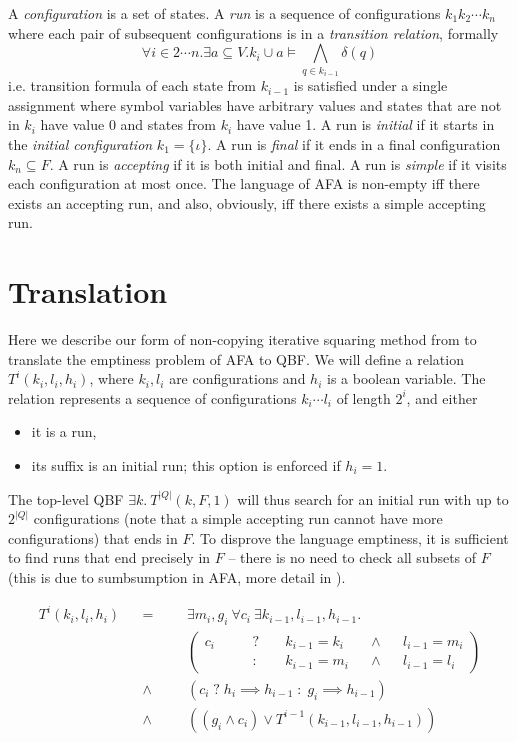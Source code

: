 \documentclass{article}
\begin{document}
A \emph{configuration} is a set of states.
%
A \emph{run} is a sequence of configurations $k_1 k_2 \cdots k_n$ where each pair of subsequent configurations is in a \emph{transition relation}, formally
\[\forall i \in {2 \cdots n}. \exists a \subseteq V. k_i \cup a \models \bigwedge_{q \in k_{i-1}} \delta(q)\]
i.e. transition formula of each state from $k_{i-1}$ is satisfied under a single assignment where symbol variables have arbitrary values and states that are not in $k_i$ have value 0 and states from $k_i$ have value 1.
%
A run is \emph{initial} if it starts in the \emph{initial configuration} $k_1 = \{\iota\}$.
A run is \emph{final} if it ends in a final configuration $k_n \subseteq F$.
A run is \emph{accepting} if it is both initial and final.
A run is \emph{simple} if it visits each configuration at most once.
%
The language of AFA is non-empty iff there exists an accepting run, and also, obviously, iff there exists a simple accepting run.

\section{Translation}

Here we describe our form of non-copying iterative squaring method from \cite{bmc2qbf} to translate the emptiness problem of AFA to QBF.
%
We will define a relation $T^i(k_i, l_i, h_i)$, where $k_i, l_i$ are configurations and $h_i$ is a boolean variable. The relation represents a sequence of configurations $k_i \cdots l_i$ of length $2^i$, and either
\begin{itemize}
  \item it is a run,
  \item its suffix is an initial run; this option is enforced if $h_i = 1$.
\end{itemize}

The top-level QBF $\exists k.~ T^{|Q|}(k, F, 1)$ will thus search for an initial run with up to $2^{|Q|}$ configurations (note that a simple accepting run cannot have more configurations) that ends in $F$.
To disprove the language emptiness, it is sufficient to find runs that end precisely in $F$ -- there is no need to check all subsets of $F$ (this is due to sumbsumption in AFA, more detail in \cite{antisat}).

\[
\begin{aligned}
  T^i(k_i, l_i, h_i) &&=&&& \exists m_i, g_i~ \forall c_i~ \exists k_{i-1}, l_{i-1}, h_{i-1}.~ \\
  &&&&& \left(
    \begin{aligned}
      c_i &&& \;?\; && k_{i-1} = k_i && \land && l_{i-1} = m_i \\
          &&& \;:\; && k_{i-1} = m_i && \land && l_{i-1} = l_i
    \end{aligned}
  \right) \\
  && \land &&& (c_i \;?\; h_i \implies h_{i-1} \;:\; g_i \implies h_{i-1}) \\
  && \land &&& ((g_i \land c_i) \lor T^{i-1}(k_{i-1}, l_{i-1}, h_{i-1}))
\end{aligned}
\]
\end{document}
